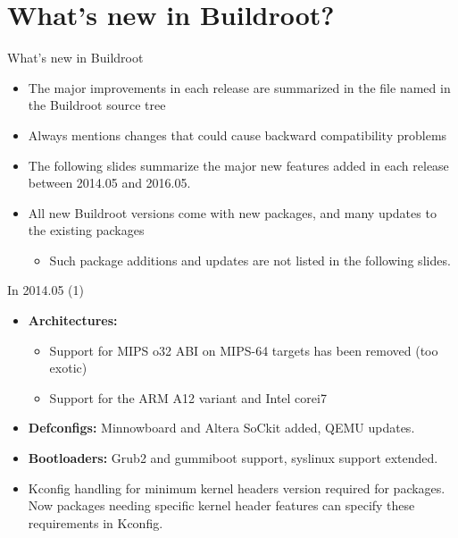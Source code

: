 \section{What's new in Buildroot?}

\begin{frame}{What's new in Buildroot}
  \begin{itemize}
  \item The major improvements in each release are summarized in the
    file named  in the Buildroot source tree
  \item Always mentions changes that could cause backward
    compatibility problems
  \item The following slides summarize the major new features added in
    each release between 2014.05 and 2016.05.
  \item All new Buildroot versions come with new packages, and many
    updates to the existing packages
    \begin{itemize}
    \item Such package additions and updates are not listed in the
      following slides.
    \end{itemize}
  \end{itemize}
\end{frame}

\begin{frame}{In 2014.05 (1)}
  \begin{itemize}
  \item {\bf Architectures:}
    \begin{itemize}
    \item Support for MIPS o32 ABI on MIPS-64 targets has
      been removed (too exotic)
    \item Support for the ARM A12 variant and Intel corei7
    \end{itemize}
  \item {\bf Defconfigs:} Minnowboard and Altera SoCkit added, QEMU
    updates.
  \item {\bf Bootloaders:} Grub2 and gummiboot support, syslinux
    support extended.
  \item Kconfig handling for minimum kernel headers version required
    for packages. Now packages needing specific kernel header features
    can specify these requirements in Kconfig.
  \end{itemize}
\end{frame}

